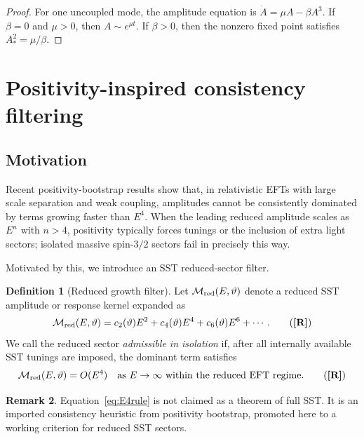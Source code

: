 \documentclass[11pt]{article}
\newcommand{\TagT}{\textbf{[T]}} %
\newcommand{\TagR}{\textbf{[R]}} %
\theoremstyle{definition}
\newtheorem{definition}{Definition}[section]
\newtheorem{remark}[definition]{Remark}
\theoremstyle{plain}
\begin{document}
\begin{proof}
For one uncoupled mode, the amplitude equation is \(\dot A=\mu A-\beta A^3\). If \(\beta=0\) and \(\mu>0\), then \(A\sim e^{\mu t}\). If \(\beta>0\), then the nonzero fixed point satisfies \(A_\ast^2=\mu/\beta\).
\end{proof}

\section{Positivity-inspired consistency filtering}\label{sec:positivity}

\subsection{Motivation}

Recent positivity-bootstrap results show that, in relativistic EFTs with large scale separation and weak coupling, amplitudes cannot be consistently dominated by terms growing faster than \(E^4\). When the leading reduced amplitude scales as \(E^n\) with \(n>4\), positivity typically forces tunings or the inclusion of extra light sectors; isolated massive spin-$3/2$ sectors fail in precisely this way. \tag{\TagT}

Motivated by this, we introduce an SST reduced-sector filter.

\begin{definition}[Reduced growth filter]
Let \(\mathcal M_{\rm red}(E,\vartheta)\) denote a reduced SST amplitude or response kernel expanded as
\begin{equation}
\mathcal M_{\rm red}(E,\vartheta)
=
c_2(\vartheta)E^2+c_4(\vartheta)E^4+c_6(\vartheta)E^6+\cdots.
\tag{\TagR}
\label{eq:Mred}
\end{equation}
We call the reduced sector \emph{admissible in isolation} if, after all internally available SST tunings are imposed, the dominant term satisfies
\begin{equation}
\mathcal M_{\rm red}(E,\vartheta)=O(E^4)
\quad\text{as }E\to \infty
\text{ within the reduced EFT regime.}
\tag{\TagR}
\label{eq:E4rule}
\end{equation}
\end{definition}

\begin{remark}
Equation~\eqref{eq:E4rule} is not claimed as a theorem of full SST. It is an imported consistency heuristic from positivity bootstrap, promoted here to a working criterion for reduced SST sectors.
\end{remark}
\end{document}
